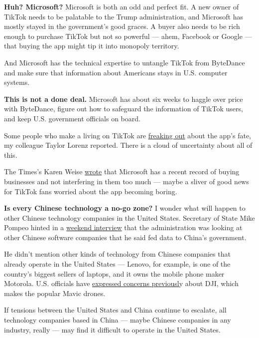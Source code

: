 \textbf{Huh? Microsoft?} Microsoft is both an odd and perfect fit. A new
owner of TikTok needs to be palatable to the Trump administration, and
Microsoft has mostly stayed in the government's good graces. A buyer
also needs to be rich enough to purchase TikTok but not so powerful ---
ahem, Facebook or Google --- that buying the app might tip it into
monopoly territory.

And Microsoft has the technical expertise to untangle TikTok from
ByteDance and make sure that information about Americans stays in U.S.
computer systems.

\textbf{This is not a done deal.} Microsoft has about six weeks to
haggle over price with ByteDance, figure out how to safeguard the
information of TikTok users, and keep U.S. government officials on
board.

Some people who make a living on TikTok are
\href{https://www.nytimes3xbfgragh.onion/2020/08/02/style/tiktok-ban-threat-trump.html}{freaking
out} about the app's fate, my colleague Taylor Lorenz reported. There is
a cloud of uncertainty about all of this.

The Times's Karen Weise
\href{https://www.nytimes3xbfgragh.onion/2020/08/03/technology/tiktok-microsoft-tweens.html}{wrote}
that Microsoft has a recent record of buying businesses and not
interfering in them too much --- maybe a sliver of good news for TikTok
fans worried about the app becoming boring.

\textbf{Is every Chinese technology a no-go zone?} I wonder what will
happen to other Chinese technology companies in the United States.
Secretary of State Mike Pompeo hinted in a
\href{https://www.state.gov/secretary-michael-r-pompeo-with-maria-bartiromo-of-fox-news-sunday-morning-futures-2/}{weekend
interview} that the administration was looking at other Chinese software
companies that he said fed data to China's government.

He didn't mention other kinds of technology from Chinese companies that
already operate in the United States --- Lenovo, for example, is one of
the country's biggest sellers of laptops, and it owns the mobile phone
maker Motorola. U.S. officials have
\href{https://www.nytimes3xbfgragh.onion/2020/07/23/us/politics/dji-drones-security-vulnerability.html}{expressed
concerns previousl}y about DJI, which makes the popular Mavic drones.

If tensions between the United States and China continue to escalate,
all technology companies based in China --- maybe Chinese companies in
any industry, really --- may find it difficult to operate in the United
States.

